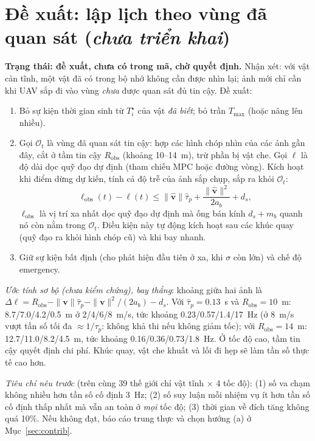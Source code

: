 \documentclass[11pt,a4paper]{article}
\numberwithin{equation}{section}
\newcommand{\vb}[1]{\bm{#1}}
\theoremstyle{definition}
\theoremstyle{plain}
\theoremstyle{remark}
\begin{document}
\section{Đề xuất: lập lịch theo vùng đã quan sát (\emph{chưa triển khai})}
\label{sec:proposal}
\textbf{Trạng thái: đề xuất, chưa có trong mã, chờ quyết định.} Nhận xét: với vật cản tĩnh, một vật đã có trong bộ nhớ không cần được nhìn lại; ảnh mới chỉ cần khi UAV sắp đi vào vùng \emph{chưa} được quan sát đủ tin cậy. Đề xuất:
\begin{enumerate}
\item Bỏ sự kiện thời gian sinh từ $T^\star_i$ của vật \emph{đã biết}; bỏ trần $T_{\max}$ (hoặc nâng lên nhiều).
\item Gọi $\mathcal O_t$ là vùng đã quan sát tin cậy: hợp các hình chóp nhìn của các ảnh gần đây, cắt ở tầm tin cậy $R_{\text{obs}}$ (khoảng 10--14~m), trừ phần bị vật che. Gọi $\ell$ là độ dài dọc quỹ đạo dự định (tham chiếu MPC hoặc đường vòng). Kích hoạt khi điểm dừng dự kiến, tính cả độ trễ của ảnh sắp chụp, sắp ra khỏi $\mathcal O_t$:
\begin{equation}
\ell_{\text{obs}}(t)-\ell(t)\le\|\hat{\vb v}\|\hat\tau_p+\frac{\|\hat{\vb v}\|^2}{2a_b}+d_s, \label{eq:coverage}
\end{equation}
$\ell_{\text{obs}}$ là vị trí xa nhất dọc quỹ đạo dự định mà ống bán kính $d_s+m_b$ quanh nó còn nằm trong $\mathcal O_t$. Điều kiện này tự động kích hoạt sau các khúc quay (quỹ đạo ra khỏi hình chóp cũ) và khi bay nhanh.
\item Giữ sự kiện bất định (cho phát hiện đầu tiên ở xa, khi $\sigma$ còn lớn) và chế độ emergency.
\end{enumerate}
\emph{Ước tính sơ bộ (chưa kiểm chứng), bay thẳng}: khoảng giữa hai ảnh là $\Delta\ell=R_{\text{obs}}-\|\vb v\|\hat\tau_p-\|\vb v\|^2/(2a_b)-d_s$. Với $\hat\tau_p=0.13$~s và $R_{\text{obs}}=10$~m: 8.7/7.0/4.2/0.5~m ở 2/4/6/8~m/s, tức khoảng 0.23/0.57/1.4/17~Hz (ở 8~m/s vượt tần số tối đa $\approx1/\tau_p$: không khả thi nếu không giảm tốc); với $R_{\text{obs}}=14$~m: 12.7/11.0/8.2/4.5~m, tức khoảng 0.16/0.36/0.73/1.8~Hz. Ở tốc độ cao, tầm tin cậy quyết định chi phí. Khúc quay, vật che khuất và lối đi hẹp sẽ làm tần số thực tế cao hơn.

\emph{Tiêu chí nêu trước} (trên cùng 39 thế giới chỉ vật tĩnh $\times$ 4 tốc độ): (1) số va chạm không nhiều hơn tần số cố định 3~Hz; (2) số suy luận mỗi nhiệm vụ ít hơn tần số cố định thấp nhất mà vẫn an toàn ở \emph{mọi} tốc độ; (3) thời gian về đích tăng không quá 10\%. Nếu không đạt, báo cáo trung thực và chọn hướng (a) ở Mục~\ref{sec:contrib}.
\end{document}
